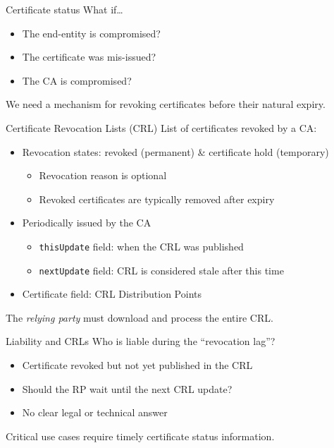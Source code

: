 \begin{frame}{Certificate status}
  What if\dots
  \begin{itemize}[<+(1)->]
    \item The end-entity is compromised?
    \item The certificate was mis-issued?
    \item The CA is compromised?
  \end{itemize}

  \vspace*{1em}

  \pause
  We need a mechanism for revoking certificates before their natural expiry.
\end{frame}

\begin{frame}{Certificate Revocation Lists (CRL)}
  List of certificates revoked by a CA:
  \begin{itemize}[<+(1)->]
    \item Revocation states: revoked (permanent) \& certificate hold (temporary)
    \begin{itemize}
      \item Revocation reason is optional
      \item Revoked certificates are typically removed after expiry
    \end{itemize}
    \item Periodically issued by the CA
    \begin{itemize}
      \item \texttt{thisUpdate} field: when the CRL was published
      \item \texttt{nextUpdate} field: CRL is considered stale after this time
    \end{itemize}
    \item Certificate field: CRL Distribution Points
  \end{itemize}

  \pause
  The \emph{relying party} must download and process the entire CRL.
\end{frame}

\begin{frame}{Liability and CRLs}
  \pause
  Who is liable during the \enquote{revocation lag}?
  \begin{itemize}[<+(1)->]
    \item Certificate revoked but not yet published in the CRL
    \item Should the RP wait until the next CRL update?
    \item No clear legal or technical answer
  \end{itemize}

  \pause
  Critical use cases require timely certificate status information.
\end{frame}

